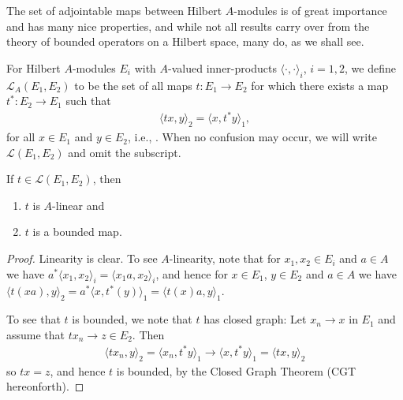 The set of adjointable maps between Hilbert $A$-modules is of great importance and has many nice properties, and while not all results carry over from the theory of bounded operators on a Hilbert space, many do, as we shall see.
\begin{definition}
	For Hilbert $A$-modules $E_i$ with $A$-valued inner-products $\langle \cdot , \cdot\rangle_i$, $i=1,2$, we define $\mathcal{L}_A(E_1,E_2)$ to be the set of all maps $t \colon E_1 \to E_2$ for which there exists a map $t^* \colon E_2 \to E_1$ such that
	\begin{align*}
		\langle tx, y \rangle_2 = \langle x , t^*y \rangle_1,
	\end{align*}
	for all $x \in E_1$ and $y \in E_2$, i.e., . When no confusion may occur, we will write $\mathcal{L}(E_1,E_2)$ and omit the subscript.
\end{definition}
\begin{proposition}
	If $t \in \mathcal{L}(E_1,E_2)$, then
\begin{enumerate}
	\item $t$ is $A$-linear and\\
	\item $t$ is a bounded map.
\end{enumerate}
\end{proposition}
\begin{proof}
	Linearity is clear. To see $A$-linearity, note that for $x_1,x_2 \in E_i$ and $a \in A$ we have $a^* \langle x_1,x_2\rangle_i = \langle x_1 a , x_2\rangle_i$, and hence for $x \in E_1$, $y \in E_2$ and $a \in A$ we have $\langle t(xa) , y \rangle_2 = a^* \langle x,t^*(y)\rangle_1 = \langle t(x)a,y\rangle_1$.

	To see that $t$ is bounded, we note that $t$ has closed graph: Let $x_n \to x$ in $E_1$ and assume that $tx_n \to z \in E_2$. Then
	\begin{align*}
		\langle tx_n , y\rangle_2  = \langle x_n, t^*y\rangle_1 \to \langle x, t^*y \rangle_1 = \langle tx,y\rangle_2
	\end{align*}
	so $tx = z$, and hence $t$ is bounded, by the Closed Graph Theorem (CGT hereonforth).
\end{proof}

